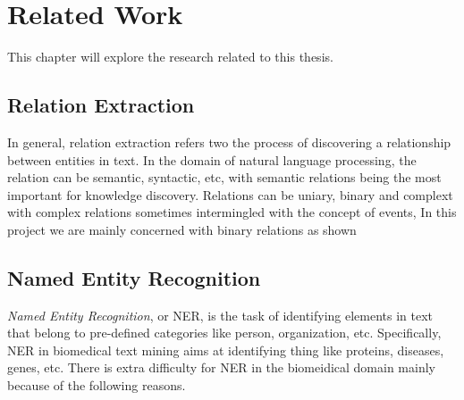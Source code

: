 \chapter{Related Work}  %

\ifpdf
    \graphicspath{{Background/Figs/Raster/}{Background/Figs/PDF/}{Background/Figs/}}
\else
    \graphicspath{{Background/Figs/Vector/}{Background/Figs/}}
\fi

This chapter will explore the research related to this thesis. 

\section{Relation Extraction} %
In general, relation extraction refers two the process of discovering a relationship between entities in text. In the domain of natural language processing, the relation can be semantic, syntactic, etc, with semantic relations being the most important for knowledge discovery. Relations can be uniary, binary and complext with complex relations sometimes intermingled with the concept of events, In this project we are mainly concerned with binary relations as shown

\section{Named Entity Recognition}
\emph{Named Entity Recognition}, or NER, is the task of identifying elements in text that belong to pre-defined categories like person, organization, etc. Specifically, NER in biomedical text mining aims at identifying thing like proteins, diseases, genes, etc. There is extra difficulty for NER in the biomeidical domain mainly because of the following reasons. 

